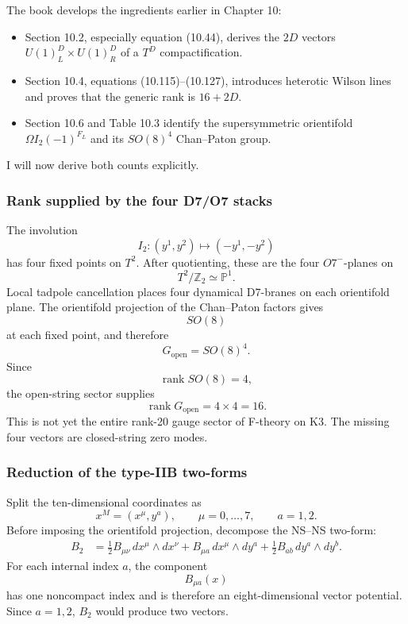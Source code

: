 \documentclass[
  10pt,
  a4paper,
  openany]{book}
\providecommand{\tightlist}{%
  \setlength{\itemsep}{0pt}\setlength{\parskip}{0pt}}
\begin{document}
The book develops the ingredients earlier in Chapter 10:

\begin{itemize}
\tightlist
\item
  Section 10.2, especially equation (10.44), derives the \(2D\) vectors
  \(U(1)^D_L\times U(1)^D_R\) of a \(T^D\) compactification.
\item
  Section 10.4, equations (10.115)--(10.127), introduces heterotic
  Wilson lines and proves that the generic rank is \(16+2D\).
\item
  Section 10.6 and Table 10.3 identify the supersymmetric orientifold
  \(\Omega I_2(-1)^{F_L}\) and its \(SO(8)^4\) Chan--Paton group.
\end{itemize}

I will now derive both counts explicitly.

\subsubsection{Rank supplied by the four D7/O7
stacks}\label{rank-supplied-by-the-four-d7o7-stacks}

The involution \[
I_2:(y^1,y^2)\longmapsto(-y^1,-y^2)
\] has four fixed points on \(T^2\). After quotienting, these are the
four \(O7^-\)-planes on \[
T^2/\mathbb Z_2\simeq\mathbb P^1.
\] Local tadpole cancellation places four dynamical D7-branes on each
orientifold plane. The orientifold projection of the Chan--Paton factors
gives \[
SO(8)
\] at each fixed point, and therefore \[
G_{\mathrm{open}}=SO(8)^4.
\] Since \[
\operatorname{rank}SO(8)=4,
\] the open-string sector supplies \[
\operatorname{rank}G_{\mathrm{open}}
=4\times4
=16.
\] This is not yet the entire rank-20 gauge sector of F-theory on K3.
The missing four vectors are closed-string zero modes.

\subsubsection{Reduction of the type-IIB
two-forms}\label{reduction-of-the-type-iib-two-forms}

Split the ten-dimensional coordinates as \[
x^M=(x^\mu,y^a),
\qquad
\mu=0,\ldots,7,
\qquad
a=1,2.
\] Before imposing the orientifold projection, decompose the NS--NS
two-form: \[
\begin{aligned}
B_2
&=\frac12B_{\mu\nu}\,dx^\mu\wedge dx^\nu
+B_{\mu a}\,dx^\mu\wedge dy^a
+\frac12B_{ab}\,dy^a\wedge dy^b.
\end{aligned}
\] For each internal index \(a\), the component \[
B_{\mu a}(x)
\] has one noncompact index and is therefore an eight-dimensional vector
potential. Since \(a=1,2\), \(B_2\) would produce two vectors.
\end{document}
